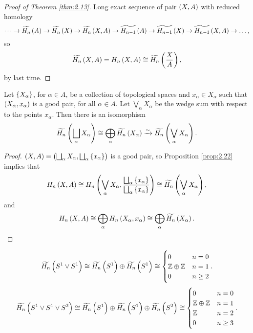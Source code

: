 \begin{proof}[Proof of Theorem \ref{thm:2.13}]
Long exact sequence of pair $ \br{X, A} $ with reduced homology
$$ \dots \to \widetilde{H_n}\br{A} \to \widetilde{H_n}\br{X} \to \widetilde{H_n}\br{X, A} \to \widetilde{H_{n - 1}}\br{A} \to \widetilde{H_{n - 1}}\br{X} \to \widetilde{H_{n - 1}}\br{X, A} \to \dots, $$
so
$$ \widetilde{H_n}\br{X, A} = H_n\br{X, A} \cong \widetilde{H_n}\br{\dfrac{X}{A}}, $$
by last time.
\end{proof}

\pagebreak


\begin{corollary}
Let $ \cbr{X_\alpha} $, for $ \alpha \in A $, be a collection of topological spaces and $ x_\alpha \in X_\alpha $ such that $ \br{X_\alpha, x_\alpha} $ is a good pair, for all $ \alpha \in A $. Let $ \bigvee_\alpha X_\alpha $ be the wedge sum with respect to the points $ x_\alpha $. Then there is an isomorphism
$$ \widetilde{H_n}\br{\bigsqcup_\alpha X_\alpha} \cong \bigoplus_\alpha \widetilde{H_n}\br{X_\alpha} \xrightarrow{\sim} \widetilde{H_n}\br{\bigvee_\alpha X_\alpha}. $$
\end{corollary}

\begin{proof}
$ \br{X, A} = \br{\bigsqcup_\alpha X_\alpha, \bigsqcup_\alpha \cbr{x_\alpha}} $ is a good pair, so Proposition \ref{prop:2.22} implies that
$$ H_n\br{X, A} \cong H_n\br{\bigvee_\alpha X_\alpha, \dfrac{\bigsqcup_\alpha \cbr{x_\alpha}}{\bigsqcup_\alpha \cbr{x_\alpha}}} \cong \widetilde{H_n}\br{\bigvee_\alpha X_\alpha}, $$
and
$$ H_n\br{X, A} \cong \bigoplus_\alpha H_n\br{X_\alpha, x_\alpha} \cong \bigoplus_\alpha \widetilde{H_n}\br{X_\alpha}. $$
\end{proof}

\begin{example*}
$$ \widetilde{H_n}\br{S^1 \vee S^1} \cong \widetilde{H_n}\br{S^1} \oplus \widetilde{H_n}\br{S^1} \cong
\begin{cases}
0 & n = 0 \\
\Z \oplus \Z & n = 1 \\
0 & n \ge 2
\end{cases}.
$$
$$ \widetilde{H_n}\br{S^1 \vee S^1 \vee S^2} \cong \widetilde{H_n}\br{S^1} \oplus \widetilde{H_n}\br{S^1} \oplus \widetilde{H_n}\br{S^2} \cong
\begin{cases}
0 & n = 0 \\
\Z \oplus \Z & n = 1 \\
\Z & n = 2 \\
0 & n \ge 3
\end{cases}.
$$
\end{example*}

